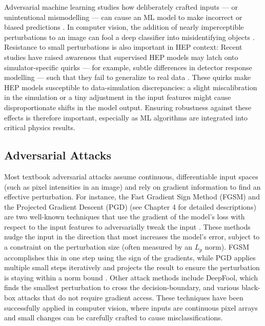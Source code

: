 Adversarial machine learning studies how deliberately crafted inputs — or unintentional mismodelling — can cause an ML model to make incorrect or biased predictions \cite{doi:10.1142/12294}. In computer vision, the addition of nearly imperceptible perturbations to an image can fool a deep classifier into misidentifying objects \cite{Stein2022}. Resistance to small perturbations is also important in HEP context: Recent studies have raised awareness that supervised HEP models may latch onto simulator-specific quirks — for example, subtle differences in detector response modelling — such that they fail to generalize to real data \cite{PhysRevD.112.016004}. These quirks make HEP models susceptible to data-simulation discrepancies: a slight miscalibration in the simulation or a tiny adjustment in the input features might cause disproportionate shifts in the model output. Ensuring robustness against these effects is therefore important, especially as ML algorithms are integrated into critical physics results.  

\subsection{Adversarial Attacks}

Most textbook adversarial attacks assume continuous, differentiable input spaces (such as pixel intensities in an image) and rely on gradient information to find an effective perturbation. For instance, the Fast Gradient Sign Method (FGSM) and the Projected Gradient Descent (PGD) (see Chapter 4 for detailed descriptions) are two well-known techniques that use the gradient of the model’s loss with respect to the input features to adversarially tweak the input \cite{goodfellow2015explainingharnessingadversarialexamples}. These methods nudge the input in the direction that most increases the model’s error, subject to a constraint on the perturbation size (often measured by an $L_p$ norm). FGSM accomplishes this in one step using the sign of the gradients, while PGD applies multiple small steps iteratively and projects the result to ensure the perturbation is staying within a norm bound \cite{madry2019deeplearningmodelsresistant}. Other attack methods include DeepFool, which finds the smallest perturbation to cross the decision-boundary, and various black-box attacks that do not require gradient access. These techniques have been successfully applied in computer vision, where inputs are continuous pixel arrays and small changes can be carefully crafted to cause misclassifications.

